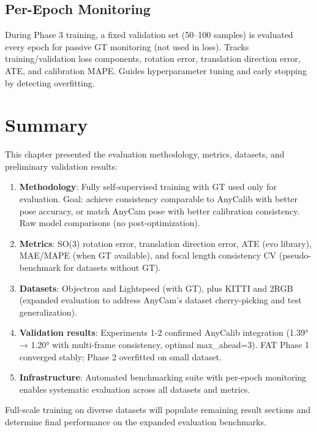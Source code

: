 \subsection{Per-Epoch Monitoring}

During Phase 3 training, a fixed validation set (50--100 samples) is evaluated every epoch for passive GT monitoring (not used in loss). Tracks training/validation loss components, rotation error, translation direction error, ATE, and calibration MAPE. Guides hyperparameter tuning and early stopping by detecting overfitting.

\section{Summary}

This chapter presented the evaluation methodology, metrics, datasets, and preliminary validation results:

\begin{enumerate}
    \item \textbf{Methodology}: Fully self-supervised training with GT used only for evaluation. Goal: achieve consistency comparable to AnyCalib with better pose accuracy, or match AnyCam pose with better calibration consistency. Raw model comparisons (no post-optimization).

    \item \textbf{Metrics}: SO(3) rotation error, translation direction error, ATE (evo library), MAE/MAPE (when GT available), and focal length consistency CV (pseudo-benchmark for datasets without GT).

    \item \textbf{Datasets}: Objectron and Lightspeed (with GT), plus KITTI and 2RGB (expanded evaluation to address AnyCam's dataset cherry-picking and test generalization).

    \item \textbf{Validation results}: Experiments 1-2 confirmed AnyCalib integration (1.39° → 1.20° with multi-frame consistency, optimal max\_ahead=3). FAT Phase 1 converged stably; Phase 2 overfitted on small dataset.

    \item \textbf{Infrastructure}: Automated benchmarking suite with per-epoch monitoring enables systematic evaluation across all datasets and metrics.
\end{enumerate}

Full-scale training on diverse datasets will populate remaining result sections and determine final performance on the expanded evaluation benchmarks.
